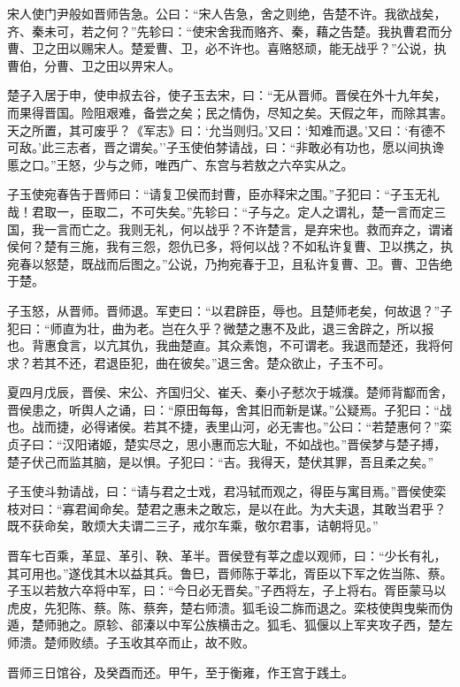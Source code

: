 \documentclass[]{article}
\begin{document}
宋人使门尹般如晋师告急。公曰：``宋人告急，舍之则绝，告楚不许。我欲战矣，齐、秦未可，若之何？''先轸曰：``使宋舍我而赂齐、秦，藉之告楚。我执曹君而分曹、卫之田以赐宋人。楚爱曹、卫，必不许也。喜赂怒顽，能无战乎？''公说，执曹伯，分曹、卫之田以畀宋人。

楚子入居于申，使申叔去谷，使子玉去宋，曰：``无从晋师。晋侯在外十九年矣，而果得晋国。险阻艰难，备尝之矣；民之情伪，尽知之矣。天假之年，而除其害。天之所置，其可废乎？《军志》曰：`允当则归。'又曰：`知难而退。'又曰：`有德不可敌。'此三志者，晋之谓矣。''子玉使伯棼请战，曰：``非敢必有功也，愿以间执谗慝之口。''王怒，少与之师，唯西广、东宫与若敖之六卒实从之。

子玉使宛春告于晋师曰：``请复卫侯而封曹，臣亦释宋之围。''子犯曰：``子玉无礼哉！君取一，臣取二，不可失矣。''先轸曰：``子与之。定人之谓礼，楚一言而定三国，我一言而亡之。我则无礼，何以战乎？不许楚言，是弃宋也。救而弃之，谓诸侯何？楚有三施，我有三怨，怨仇已多，将何以战？不如私许复曹、卫以携之，执宛春以怒楚，既战而后图之。''公说，乃拘宛春于卫，且私许复曹、卫。曹、卫告绝于楚。

子玉怒，从晋师。晋师退。军吏曰：``以君辟臣，辱也。且楚师老矣，何故退？''子犯曰：``师直为壮，曲为老。岂在久乎？微楚之惠不及此，退三舍辟之，所以报也。背惠食言，以亢其仇，我曲楚直。其众素饱，不可谓老。我退而楚还，我将何求？若其不还，君退臣犯，曲在彼矣。''退三舍。楚众欲止，子玉不可。

夏四月戊辰，晋侯、宋公、齐国归父、崔夭、秦小子憖次于城濮。楚师背酅而舍，晋侯患之，听舆人之诵，曰：``原田每每，舍其旧而新是谋。''公疑焉。子犯曰：``战也。战而捷，必得诸侯。若其不捷，表里山河，必无害也。''公曰：``若楚惠何？''栾贞子曰：``汉阳诸姬，楚实尽之，思小惠而忘大耻，不如战也。''晋侯梦与楚子搏，楚子伏己而监其脑，是以惧。子犯曰：``吉。我得天，楚伏其罪，吾且柔之矣。''

子玉使斗勃请战，曰：``请与君之士戏，君冯轼而观之，得臣与寓目焉。''晋侯使栾枝对曰：``寡君闻命矣。楚君之惠未之敢忘，是以在此。为大夫退，其敢当君乎？既不获命矣，敢烦大夫谓二三子，戒尔车乘，敬尔君事，诘朝将见。''

晋车七百乘，革显、革引、鞅、革半。晋侯登有莘之虚以观师，曰：``少长有礼，其可用也。''遂伐其木以益其兵。鲁巳，晋师陈于莘北，胥臣以下军之佐当陈、蔡。子玉以若敖六卒将中军，曰：``今日必无晋矣。''子西将左，子上将右。胥臣蒙马以虎皮，先犯陈、蔡。陈、蔡奔，楚右师溃。狐毛设二旆而退之。栾枝使舆曳柴而伪遁，楚师驰之。原轸、郤溱以中军公族横击之。狐毛、狐偃以上军夹攻子西，楚左师溃。楚师败绩。子玉收其卒而止，故不败。

晋师三日馆谷，及癸酉而还。甲午，至于衡雍，作王宫于践土。
\end{document}
